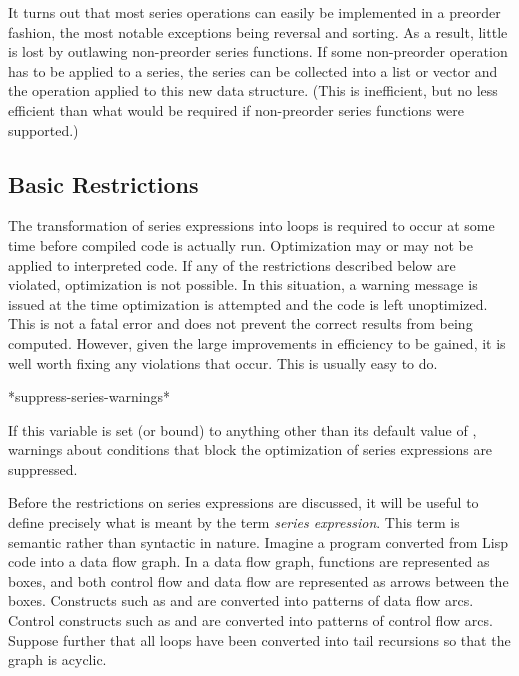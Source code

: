 It turns out that most series operations can easily be implemented in a
preorder fashion, the most notable exceptions being reversal and sorting.  As
a result, little is lost by outlawing non-preorder series functions.  If some
non-preorder operation has to be applied to a series, the series can be
collected into a list or vector and the operation applied to this new data
structure.  (This is inefficient, but no less efficient than what would be
required if non-preorder series functions were supported.)

\subsection{Basic Restrictions}

The transformation of series expressions into loops is required to occur at
some time before compiled code is actually run.  Optimization may or may
not be applied to interpreted code.  If any of the restrictions described
below are violated, optimization is not possible.  In this situation, a
warning message is issued at the time optimization is attempted and the
code is left unoptimized.  This is not a fatal error and does not prevent
the correct results from being computed.  However, given the large
improvements in efficiency to be gained, it is well worth fixing any
violations that occur.  This is usually easy to do.

\begin{defun}[Variable]
*suppress-series-warnings*

If this variable is set (or bound) to anything other than its default
value of , warnings about conditions that block the optimization
of series expressions are suppressed.
\end{defun}

Before the restrictions on series expressions are discussed, it will be useful to
define precisely what is meant by the term {\it series expression}.  This
term is semantic rather than syntactic in nature. Imagine a program
converted from Lisp code into a data flow graph.  In a data flow graph,
functions are represented as boxes, and both control flow and data flow are
represented as arrows between the boxes.  Constructs such as  and
 are converted into patterns of data flow arcs.  Control
constructs such as  and  are converted into patterns of
control flow arcs.  Suppose further that all loops have been converted
into tail recursions so that the graph is acyclic.

